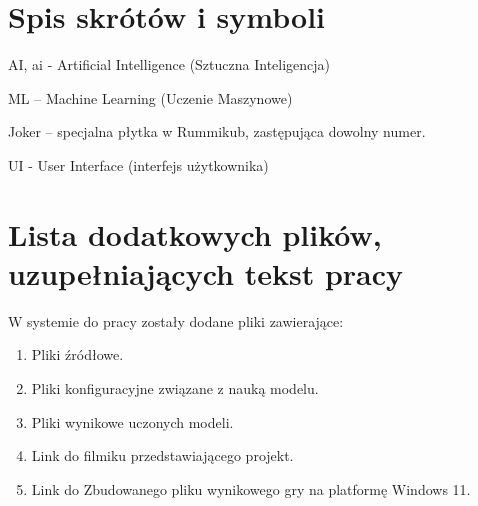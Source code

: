 \documentclass[a4paper,twoside,12pt]{book}
\begin{document}
	\begin{appendices}
		
		\chapter{Spis skrótów i symboli}
		AI, ai - Artificial Intelligence (Sztuczna Inteligencja)
		
		ML – Machine Learning (Uczenie Maszynowe)
		
		Joker – specjalna płytka w Rummikub, zastępująca dowolny numer.
		
		UI - User Interface (interfejs użytkownika)
		
		
		\chapter{Lista dodatkowych plików, uzupełniających tekst pracy} 
		W systemie do pracy zostały dodane pliki zawierające:
		\begin{enumerate}
			\item Pliki źródłowe.
			\item Pliki konfiguracyjne związane z nauką modelu.
			\item Pliki wynikowe uczonych modeli.
			\item Link do filmiku przedstawiającego projekt.
			\item Link do Zbudowanego pliku wynikowego gry na platformę Windows 11.
		\end{enumerate}
		
		\newpage
		\listoffigures
		\lstlistoflistings
		
	\end{appendices}
	
\end{document}

